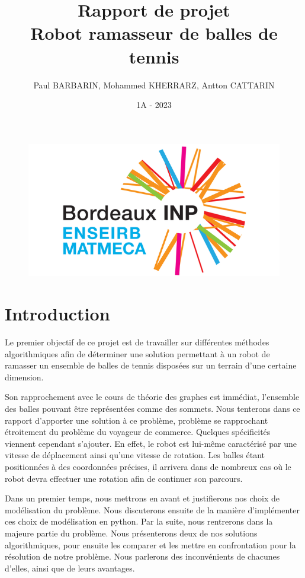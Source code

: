 \documentclass[12pt]{article}
\title{Rapport de projet \\ \textbf{Robot ramasseur de balles de tennis}}
\author{Paul BARBARIN, Mohammed KHERRARZ, Antton CATTARIN}
\date{1A - 2023}
\begin{document}
    \begin{titlepage}

        \begin{figure}
            \centering
            \includegraphics{img/enseirb}
        \end{figure}
        \maketitle

    \end{titlepage}

    \tableofcontents
    \pagebreak
    
    \section{Introduction}
    \label{sec:intro}

    Le premier objectif de ce projet est de travailler sur différentes méthodes algorithmiques afin de déterminer une solution permettant à un robot de ramasser un ensemble de balles de tennis disposées sur un terrain d'une certaine dimension.

    Son rapprochement avec le cours de théorie des graphes est immédiat, l'ensemble des balles pouvant être représentées comme des sommets. Nous tenterons dans ce rapport d'apporter une solution à ce problème, problème se rapprochant étroitement du problème du voyageur de commerce.
    Quelques spécificités viennent cependant s'ajouter. En effet, le robot est lui-même caractérisé par une vitesse de déplacement ainsi qu'une vitesse de rotation. Les balles étant positionnées à des coordonnées précises, il arrivera dans de nombreux cas où le robot devra effectuer une rotation afin de continuer son parcours.

    Dans un premier temps, nous mettrons en avant et justifierons nos choix de modélisation du problème. Nous discuterons ensuite de la manière d'implémenter ces choix de modélisation en python. Par la suite, nous rentrerons dans la majeure partie du problème. Nous présenterons deux de nos solutions algorithmiques, pour ensuite les comparer et les mettre en confrontation pour la résolution de notre problème. Nous parlerons des inconvénients de chacunes d'elles, ainsi que de leurs avantages.
\end{document}

